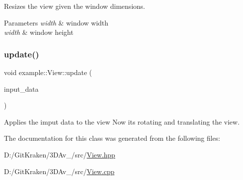 Resizes the view given the window dimensions. 


\begin{DoxyParams}{Parameters}
{\em width} & window width \\
\hline
{\em width} & window height \\
\hline
\end{DoxyParams}
\mbox{\label{classexample_1_1_view_ac0b18fc4d2abe1abca6940c55313ef3b}} 
\subsubsection{\texorpdfstring{update()}{update()}}
{\footnotesize\ttfamily void example\+::\+View\+::update (\begin{DoxyParamCaption}\item[{\mbox{\hyperlink{classexample_1_1_input_af6bf4fd763ca01bd106ca3b03f162e3d}{Input\+::\+Input\+Data}}}]{input\+\_\+data }\end{DoxyParamCaption})}



Applies the imput data to the view Now it\textquotesingle{}s rotating and translating the view. 



The documentation for this class was generated from the following files\+:\begin{DoxyCompactItemize}
\item 
D\+:/\+Git\+Kraken/3\+D\+Av\+\_/src/\mbox{\hyperlink{_view_8hpp}{View.\+hpp}}\item 
D\+:/\+Git\+Kraken/3\+D\+Av\+\_/src/\mbox{\hyperlink{_view_8cpp}{View.\+cpp}}\end{DoxyCompactItemize}
